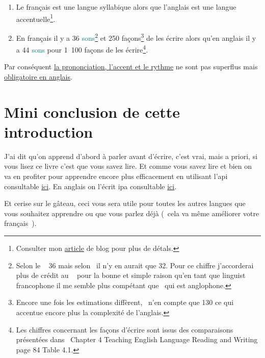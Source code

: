 \begin{enumerate}
\item Le français est une langue syllabique alors que l'anglais est
  une langue accentuelle\footnote{Consulter mon \href{http://doyouspeakenglish.fr/laccent-tonique-en-anglais/}{article} de
    blog pour plus de détals.}.
\item En français il y a 36 \textcolor{teal}{sons}\footnote{Selon le
    ~\cite{ge} 36 mais selon~\cite{sousa} il n'y en aurait que
    32. Pour ce chiffre j'accorderai plus de crédit au ~\cite{ge} pour
    la bonne et simple raison qu'en tant que \gls{linguist}
    francophone il me semble plus compétant que~\cite{sousa} qui est 
    anglophone.} et 250 façons\footnote{Encore une fois les
    estimations diffèrent,~\cite{ge} n'en compte que 130 ce qui accentue
    encore plus la complexité de l'anglais.} de les écrire alors qu'en
  anglais il y a 44 \textcolor{teal}{sons} pour 1~100 façons de les écrire\footnote{Les
    chiffres concernant les façons d'écrire sont issus des
    comparaisons présentées dans~\cite{sousa} Chapter 4 Teaching
    English Language Reading and Writing page 84 Table 4.1.}.
\end{enumerate}

Par conséquent \underline{la prononciation, l'accent et le rythme} ne sont pas
superflus mais \underline{obligatoire en anglais}.\par


\newpage
\section{Mini conclusion de cette introduction}\label{sec:mini}
J'ai dit qu'on apprend d'abord à parler avant d'écrire, c'est vrai,
mais a priori, si vous lisez ce livre c'est que vous savez lire. Et
comme vous savez lire et bien on va en profiter pour apprendre encore
plus efficacement en utilisant
l'\acrfull{api} consultable
\href{https://fr.wikipedia.org/wiki/Alphabet_phon\%C3\%A9tique_international}{ici}. En
anglais on l'écrit \acrfull{ipa} consultable \href{https://en.wikipedia.org/wiki/International_Phonetic_Alphabet}{ici}.\par

Et cerise sur le gâteau, ceci vous sera utile pour toutes les autres
langues que vous souhaitez apprendre ou que vous parlez déjà (~cela va
même améliorer votre français~).

